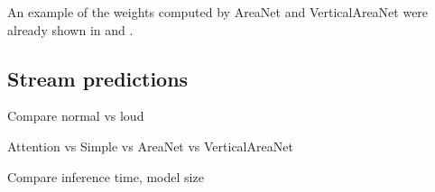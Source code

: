 An example of the weights computed by AreaNet and VerticalAreaNet were already shown 
in  and .

\subsection{Stream predictions}

Compare normal vs loud

Attention vs Simple vs AreaNet vs VerticalAreaNet

Compare inference time, model size
